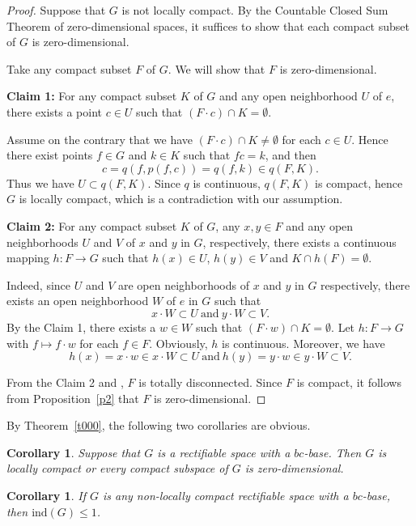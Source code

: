 \documentclass[psamsfonts,fceqn,leqno]{amsart}
\newtheorem{corollary}[theorem]{Corollary}
\theoremstyle{definition}
\begin{document}
\begin{proof}
Suppose that $G$ is not locally compact. By the Countable Closed Sum Theorem of zero-dimensional spaces, it suffices to show that each compact subset of $G$ is zero-dimensional.

Take any compact subset $F$ of $G$. We will show that $F$ is zero-dimensional.
\smallskip

{\bf Claim 1:} For any compact subset $K$ of $G$ and any open neighborhood $U$ of $e$, there exists a point $c\in U$ such that $(F\cdot c)\cap K=\emptyset$.
\smallskip

Assume on the contrary that we have $(F\cdot c)\cap K\neq\emptyset$ for each $c\in U$. Hence there exist points $f\in G$ and $k\in K$ such that $fc=k$, and then $$c=q(f, p(f, c))=q(f, k)\in q(F, K).$$
Thus we have $U\subset q(F, K)$. Since $q$ is continuous, $q(F, K)$ is compact, hence $G$ is locally compact, which is a contradiction with our assumption.
\smallskip

{\bf Claim 2:} For any compact subset $K$ of $G$, any $x, y\in F$ and any open neighborhoods $U$ and $V$ of $x$ and $y$ in $G$, respectively, there exists a continuous mapping $h: F\rightarrow G$ such that $h(x)\in U$, $h(y)\in V$ and $K\cap h(F)=\emptyset$.
\smallskip

Indeed, since $U$ and $V$ are open neighborhoods of $x$ and $y$ in $G$ respectively, there exists an open neighborhood $W$ of $e$ in $G$ such that $$x\cdot W\subset U\ \mbox{and}\ y\cdot W\subset V.$$ By the Claim 1, there exists a $w\in W$ such that $(F\cdot w)\cap K=\emptyset$. Let $h: F\rightarrow G$ with $f\mapsto f\cdot w$ for each $f\in F$. Obviously, $h$ is continuous. Moreover, we have $$h(x)=x\cdot w\in x\cdot W\subset U\ \mbox{and}\ h(y)=y\cdot w\in y\cdot W\subset V.$$

From the Claim 2 and \cite[Proposition 3.4]{A2014}, $F$ is totally disconnected. Since $F$ is compact, it follows from Proposition~\ref{p2} that $F$ is zero-dimensional.
\end{proof}

By Theorem~\ref{t000}, the following two corollaries are obvious.

\begin{corollary}\label{c5}
Suppose that $G$ is a rectifiable space with a $bc$-base.
Then $G$ is locally compact or every compact subspace of $G$ is zero-dimensional.
\end{corollary}

\begin{corollary}
If $G$ is any non-locally compact rectifiable space with a $bc$-base, then
$\mbox{ind}(G) \leq 1$.
\end{corollary}
\end{document}
